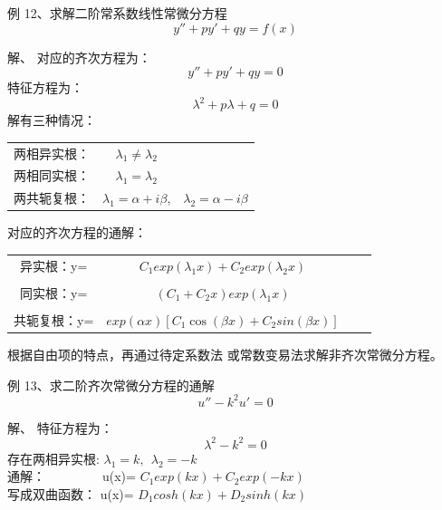 \begin{frame}
\begin{exampleblock} {例 12、求解二阶常系数线性常微分方程}
	\begin{equation*}
		y''+py'+qy=f(x)
	\end{equation*}
	\end{exampleblock}
	\alert{解、} 对应的齐次方程为：
	\begin{equation*}
		y''+py'+qy=0
	\end{equation*}
	特征方程为：
	\begin{equation*}
		\lambda^2 +p\lambda +q=0
	\end{equation*}
	解有三种情况：
	\begin{table} [H]
	\begin{tabular}{ccc}
		两相异实根：& $\lambda_1 \ne \lambda_2 $ & \\
		两相同实根：& $\lambda_1 = \lambda_2 $  &\\
		两共轭复根：& $\lambda_1=\alpha+i\beta $, & $\lambda_2=\alpha-i\beta$\\ 
	\end{tabular}
	\end{table}
\end{frame}

\begin{frame}
	对应的齐次方程的通解：
	\begin{table} [H]
	\begin{tabular}{cccc}
		异实根：y=& $C_1 exp(\lambda_1 x)+ C_2 exp (\lambda_2 x) $  \\  
		\\
		同实根：y=&$(C_1+C_2x)  exp (\lambda_1 x) $   \\  
		\\
		共轭复根：y=& $ exp(\alpha x)  [C_1 \cos (\beta x)+ C_2 sin (\beta x)] $\\   
	\end{tabular}
	\end{table}
	根据自由项的特点，再通过待定系数法 或常数变易法求解非齐次常微分方程。
\end{frame}

\begin{frame}
\begin{exampleblock} {例 13、求二阶齐次常微分方程的通解}
	\begin{equation*}
		u''-k^2u'=0
	\end{equation*}
	\end{exampleblock}
	\alert{解、}  特征方程为：
	\begin{equation*}
		\lambda^2 -k^2=0
	\end{equation*}
	存在两相异实根: $\lambda_1=k, ~~ \lambda_2 =-k $ \\    	\vspace{0.3cm}
	通解：~~~~~~~~~u(x)= $C_1 exp(k x)+ C_2 exp (-k x) $  \\  	\vspace{0.3cm}
	写成双曲函数： u(x)= $D_1 cosh(k x)+ D_2 sinh (k x) $  \\
\end{frame}

